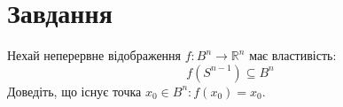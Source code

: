 
\chapter{Завдання \theHchapter}

\begin{tcolorbox}[title=Завдання]
    Нехай неперервне відображення 
    $f: B^{n} \rightarrow \mathbb{R}^{n}$ має властивість:
    $$f\left(S^{n-1}\right) \subseteq B^{n}$$
    Доведіть, що існує точка $x_{0} \in B^{n}: f\left(x_{0}\right)=x_{0}$.
\end{tcolorbox}



